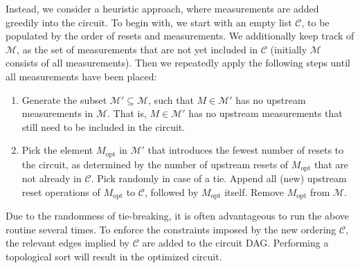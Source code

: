 Instead, we consider a heuristic approach, where measurements are added greedily into the circuit. To begin with, we start with an empty list $\mathcal{C}$, to be populated by the order of resets and measurements. We additionally keep track of $\mathcal{M}$, as the set of measurements that are not yet included in $\mathcal{C}$ (initially $\mathcal{M}$ consists of all measurements).
Then we repeatedly apply the following steps until all measurements have been placed:
\begin{enumerate}
    \item Generate the subset $\mathcal{M}'\subseteq \mathcal{M}$, such that $M\in \mathcal{M}'$ has no upstream measurements in $\mathcal{M}$. That is, $M\in \mathcal{M}'$ has no upstream measurements that still need to be included in the circuit.
    \item Pick the element $M_{\mathrm{opt}}$ in $\mathcal{M}'$ that introduces the fewest number of resets to the circuit, as determined by the number of upstream resets of $M_{\mathrm{opt}}$ that are not already in $\mathcal{C}$. Pick randomly in case of a tie.  Append all (new) upstream reset operations of $M_{\mathrm{opt}}$ to $\mathcal{C}$, followed by $M_{\mathrm{opt}}$ itself. Remove $M_{\mathrm{opt}}$ from $\mathcal{M}$.
\end{enumerate}
Due to the randomness of tie-breaking, it is often advantageous to run the above routine several times. To enforce the constraints imposed by the new ordering $\mathcal{C}$, the relevant edges implied by $\mathcal{C}$ are added to the circuit DAG. Performing a topological sort will result in the optimized circuit.

